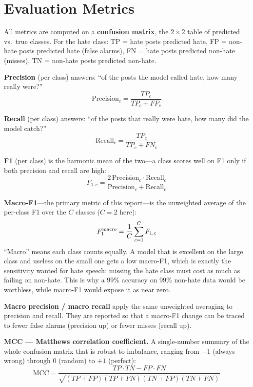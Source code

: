 \section{Evaluation Metrics}
\label{app:metrics}

All metrics are computed on a \textbf{confusion matrix}, the $2\times2$ table of
predicted vs.\ true classes. For the hate class: TP = hate posts predicted hate,
FP = non-hate posts predicted hate (false alarms), FN = hate posts predicted
non-hate (misses), TN = non-hate posts predicted non-hate.

\textbf{Precision} (per class) answers: ``of the posts the model called hate, how
many really were?''
\begin{equation}
\mathrm{Precision}_{c} = \frac{TP_{c}}{TP_{c} + FP_{c}}
\end{equation}

\textbf{Recall} (per class) answers: ``of the posts that really were hate, how
many did the model catch?''
\begin{equation}
\mathrm{Recall}_{c} = \frac{TP_{c}}{TP_{c} + FN_{c}}
\end{equation}

\textbf{F1} (per class) is the harmonic mean of the two---a class scores well on
F1 only if both precision and recall are high:
\begin{equation}
F_{1,c} = \frac{2\,\mathrm{Precision}_{c}\cdot\mathrm{Recall}_{c}}
               {\mathrm{Precision}_{c} + \mathrm{Recall}_{c}}
\end{equation}

\textbf{Macro-F1}---the primary metric of this report---is the unweighted average
of the per-class F1 over the $C$ classes ($C=2$ here):
\begin{equation}
F_{1}^{\mathrm{macro}} = \frac{1}{C}\sum_{c=1}^{C} F_{1,c}
\end{equation}
``Macro'' means each class counts equally. A model that is excellent on the large
class and useless on the small one gets a low macro-F1, which is exactly the
sensitivity wanted for hate speech: missing the hate class must cost as much as
failing on non-hate. This is why a 99\% accuracy on 99\% non-hate data would be
worthless, while macro-F1 would expose it as near zero.

\textbf{Macro precision / macro recall} apply the same unweighted averaging to
precision and recall. They are reported so that a macro-F1 change can be traced
to fewer false alarms (precision up) or fewer misses (recall up).

\textbf{MCC --- Matthews correlation coefficient.} A single-number summary of the
whole confusion matrix that is robust to imbalance, ranging from $-1$ (always
wrong) through 0 (random) to $+1$ (perfect):
\begin{equation}
\mathrm{MCC} =
\frac{TP\cdot TN - FP\cdot FN}
     {\sqrt{(TP+FP)(TP+FN)(TN+FP)(TN+FN)}}
\end{equation}


